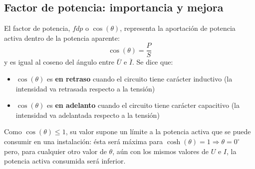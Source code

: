 \documentclass[11pt]{book} %
\begin{document}
	
	\subsection{Factor de potencia: importancia y mejora}\label{sec.mejora_fdp_monofasica}
	
	El factor de potencia, $fdp$ o $\cos(\theta)$, representa la aportación de potencia activa dentro de la potencia aparente:
	\begin{equation}
		\boxed{\cos(\theta)=\dfrac{P}{S}}
	\end{equation}
	y es igual al coseno del ángulo entre $\overline{U}$ e $\overline{I}$. Se dice que:
	\begin{itemize}
		\item $\cos(\theta)$ es \textbf{en retraso} cuando el circuito tiene carácter inductivo (la intensidad va retrasada respecto a la tensión)
		\item $\cos(\theta)$ es \textbf{en adelanto} cuando el circuito tiene carácter capacitivo (la intensidad va adelantada respecto a la tensión)
	\end{itemize}
	\begin{remark}
		Como $\cos(\theta)\leq 1$, su valor supone un límite a la potencia activa que se puede consumir en una instalación: ésta será máxima para $\cosh(\theta)=1\Rightarrow \theta=0^\circ$ pero, para cualquier otro valor de $\theta$, aún con los mismos valores de $U$ e $I$, la potencia activa consumida será inferior. 
	\end{remark}
	
\end{document}
